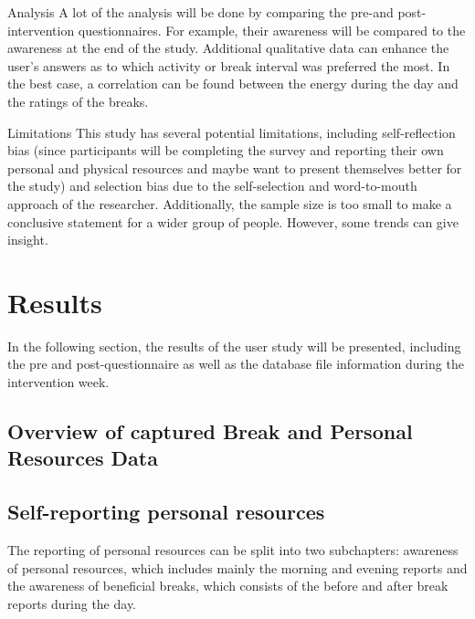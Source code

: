 \documentclass{hasel_thesis}
\begin{document}
	
Analysis
A lot of the analysis will be done by comparing the pre-and post-intervention questionnaires. For example, their awareness will be compared to the awareness at the end of the study. Additional qualitative data can enhance the user's answers as to which activity or break interval was preferred the most. In the best case, a correlation can be found between the energy during the day and the ratings of the breaks. 
 
Limitations 
This study has several potential limitations, including self-reflection bias (since participants will be completing the survey and reporting their own personal and physical resources and maybe want to present themselves better for the study) and selection bias due to the self-selection and word-to-mouth approach of the researcher. Additionally, the sample size is too small to make a conclusive statement for a wider group of people. However, some trends can give insight.

\chapter{Results}

In the following section, the results of the user study will be presented, including the pre and post-questionnaire as well as the database file information during the intervention week.
\section{Overview of captured Break and Personal Resources Data}


\section{Self-reporting personal resources}

The reporting of personal resources can be split into two subchapters: awareness of personal resources, which includes mainly the morning and evening reports and the awareness of beneficial breaks, which consists of the before and after break reports during the day.
\end{document}
